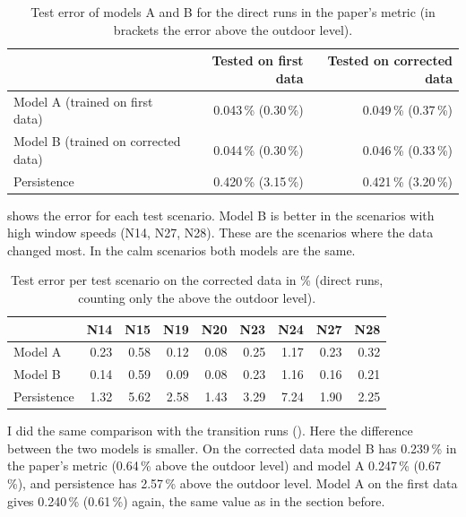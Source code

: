 \begin{table}[h]
  \centering
  \caption[Models A and B, direct runs.]{Test error of models A and B for the direct runs in the paper's metric
  (in brackets the error above the outdoor level).}
  \label{tab:ab}
  \begin{tabular}{lrr}
    \toprule
     & Tested on first data & Tested on corrected data\\
    \midrule
    Model A (trained on first data) & 0.043\,\% (0.30\,\%) & 0.049\,\% (0.37\,\%)\\
    Model B (trained on corrected data) & 0.044\,\% (0.30\,\%) & 0.046\,\% (0.33\,\%)\\
    Persistence & 0.420\,\% (3.15\,\%) & 0.421\,\% (3.20\,\%)\\
    \bottomrule
  \end{tabular}
\end{table}

 shows the error for each test scenario. Model B is better in the scenarios with high
window speeds (N14, N27, N28). These are the scenarios where the data changed most. In the calm scenarios both
models are the same.

\begin{table}[h]
  \centering
  \caption[Test error per test scenario.]{Test error per test scenario on the corrected data in \%
  (direct runs, counting only the \cotwo{} above the outdoor level).}
  \label{tab:ab_cases}
  \footnotesize
  \begin{tabular}{lrrrrrrrr}
    \toprule
     & N14 & N15 & N19 & N20 & N23 & N24 & N27 & N28\\
    \midrule
    Model A & 0.23 & 0.58 & 0.12 & 0.08 & 0.25 & 1.17 & 0.23 & 0.32\\
    Model B & 0.14 & 0.59 & 0.09 & 0.08 & 0.23 & 1.16 & 0.16 & 0.21\\
    Persistence & 1.32 & 5.62 & 2.58 & 1.43 & 3.29 & 7.24 & 1.90 & 2.25\\
    \bottomrule
  \end{tabular}
\end{table}

I did the same comparison with the transition runs (). Here the difference between the two
models is smaller. On the corrected data model B has 0.239\,\% in the paper's metric (0.64\,\% above the outdoor
level) and model A 0.247\,\% (0.67\,\%), and persistence has 2.57\,\% above the outdoor level. Model A on the
first data gives 0.240\,\% (0.61\,\%) again, the same value as in the section before.

